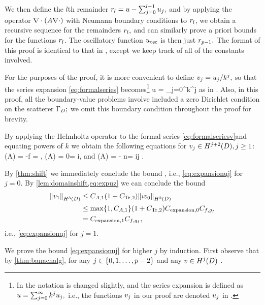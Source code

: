 We then define the $l$th remainder $r_{l} = u - \sum_{j=0}^{l-1} u_{j},$ and by applying the operator $\grad\cdot\mleft(A\grad \cdot\mright)$ with Neumann boundary conditions to $r_{l}$, we obtain a recursive sequence for the remainders $r_{l},$ and can similarly prove a priori bounds for the functions $r_{l}$. The oscillatory function $u_{\mathrm{osc}}$ is then just $r_{p-1}.$ The format of this proof is identical to that in \cite[Theorem 1]{ChNi:19}, except we keep track of all of the constants involved.

For the purposes of the proof, it is more convenient to define $v_{j} = u_{j}/k^j,$ so that the series expansion \cref{eq:formalseries} becomes\footnote{In \cite{ChNi:19} the notation is changed slightly, and the series expansion is defined as $u = \sum_{j=0}^\infty k^j u_{j},$ i.e., the functions $v_{j}$ in our proof are denoted $u_{j}$ in \cite{ChNi:19}.}
\beq\label{eq:formalseriesv}
u = \sum_{j=0}^\infty k^j\vj
\eeq
as in \cite{ChNi:19}. Also, in this proof, all the boundary-value problems involve included a zero Dirichlet condition on the scatterer $\Gamma_{D};$ we omit this boundary condition throughout the proof for brevity.

By applying the Helmholtz operator to the formal series \eqref{eq:formalseriesv}and equating powers of $k$ we obtain the following equations for $\vj \in \HjptD, j \geq 1$:
\beqs
\grad \cdot \mleft(A\grad \vz\mright) = -f \quad\tand\quad \dn \vz = \gI,
\eeqs
\beqs
\grad \cdot \mleft(A\grad \vo\mright) = 0\quad\tand\quad\dn \vo = i\trI\vz,
\eeqs
and
\beq\label{eq:vj}
\grad \cdot \mleft(A\grad \vj\mright) = - n\vjmt\quad\tand\quad\dn \vz = i\trI\vjmo \quad\tfor j \in \mleft[2,p-2\mright].
\eeq

By \cref{thm:shift} we immediately conclude the bound
\beq\label{eq:expuz}
\NHtD{\vz} \leq \CAz\Cfg \leq {}\Cfg,
\eeq
i.e., \cref{eq:expansionuj} for $j=0.$ By \cref{lem:domainshift,eq:expuz} we can conclude the bound
\begin{align*}
  \NHthD{\vo} &\leq \CAo \mleft(1+\CTrt\mright)\NHtD{i\vz}\\
  &\leq \max\set{1,\CAo}\mleft(1+\CTrfn{2}\mright)\Cefn{0} \Cfg\\
  &= \Cefn{1}\Cfg,
\end{align*}
i.e., \cref{eq:expansionuj} for $j=1$.

We prove the bound \cref{eq:expansionuj} for higher $j$ by induction. First observe that by \cref{thm:banachalg}, for any $j \in \set{0,1,\ldots,p-2}$ and any $v \in \HjD$
\beqs
{} \leq \Cmult {} .
\eeqs

